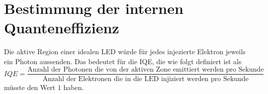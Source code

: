 \section{Bestimmung der internen Quanteneffizienz}


Die aktive Region einer idealen LED würde für jedes injezierte Elektron jeweils ein Photon aussenden. 
Das bedeutet für die IQE, die wie folgt definiert ist \cite{schub} als 
\begin{equation}
    IQE = \frac{\text{Anzahl der Photonen die von der aktiven Zone emittiert werden pro Sekunde}}{\text{Anzahl der Elektronen die in die LED injiziert werden pro Sekunde}}
\end{equation}
müsste den Wert $1$ haben.